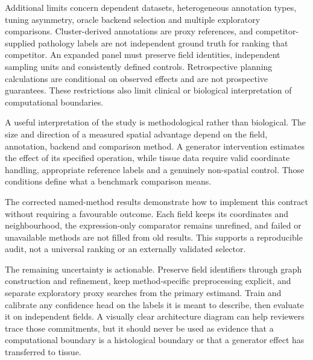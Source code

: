 \documentclass[11pt]{article}
\begin{document}
Additional limits concern dependent datasets, heterogeneous annotation types, tuning asymmetry, oracle backend selection and multiple exploratory comparisons. Cluster-derived annotations are proxy references, and competitor-supplied pathology labels are not independent ground truth for ranking that competitor. An expanded panel must preserve field identities, independent sampling units and consistently defined controls. Retrospective planning calculations are conditional on observed effects and are not prospective guarantees. These restrictions also limit clinical or biological interpretation of computational boundaries.


A useful interpretation of the study is methodological rather than biological. The size and direction of a measured spatial advantage depend on the field, annotation, backend and comparison method. A generator intervention estimates the effect of its specified operation, while tissue data require valid coordinate handling, appropriate reference labels and a genuinely non-spatial control. Those conditions define what a benchmark comparison means.

The corrected named-method results demonstrate how to implement this contract without requiring a favourable outcome. Each field keeps its coordinates and neighbourhood, the expression-only comparator remains unrefined, and failed or unavailable methods are not filled from old results. This supports a reproducible audit, not a universal ranking or an externally validated selector.

The remaining uncertainty is actionable. Preserve field identifiers through graph construction and refinement, keep method-specific preprocessing explicit, and separate exploratory proxy searches from the primary estimand. Train and calibrate any confidence head on the labels it is meant to describe, then evaluate it on independent fields. A visually clear architecture diagram can help reviewers trace those commitments, but it should never be used as evidence that a computational boundary is a histological boundary or that a generator effect has transferred to tissue.

\FloatBarrier
\end{document}

